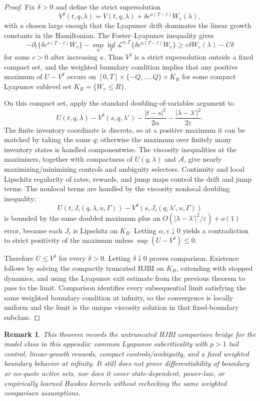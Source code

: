 \documentclass[11pt]{article}
\newtheorem{remark}[assumption]{Remark}
\begin{document}
\begin{proof}
Fix $\delta>0$ and define the strict supersolution
\[
V^\delta(t,q,\lambda)
=V(t,q,\lambda)+\delta e^{a(T-t)}W_v(\lambda),
\]
with $a$ chosen large enough that the Lyapunov drift dominates the linear
growth constants in the Hamiltonian. The Foster--Lyapunov inequality gives
\[
-\partial_t\{\delta e^{a(T-t)}W_v\}
-\sup_u\inf_\Gamma \mathcal L^{u,\Gamma}
\{\delta e^{a(T-t)}W_v\}
\ge c\delta W_v(\lambda)-C\delta
\]
for some $c>0$ after increasing $a$. Thus $V^\delta$ is a strict
supersolution outside a fixed compact set, and the weighted boundary condition
implies that any positive maximum of $U-V^\delta$ occurs on
$[0,T]\times\{-Q,\ldots,Q\}\times K_R$ for some compact Lyapunov sublevel set
$K_R=\{W_v\le R\}$.

On this compact set, apply the standard doubling-of-variables argument to
\[
U(t,q,\lambda)-V^\delta(s,q,\lambda')
-\frac{|t-s|^2}{2\alpha}
-\frac{|\lambda-\lambda'|^2}{2\varepsilon}.
\]
The finite inventory coordinate is discrete, so at a positive maximum it can
be matched by taking the same $q$; otherwise the maximum over finitely many
inventory states is handled componentwise. The viscosity inequalities at the
maximizers, together with compactness of $U(q,\lambda)$ and $\mathcal A$, give
nearly maximizing/minimizing controls and ambiguity selectors. Continuity and
local Lipschitz regularity of rates, rewards, and jump maps control the drift
and jump terms. The nonlocal terms are handled by the viscosity nonlocal
doubling inequality:
\[
U(t,J_i(q,\lambda,u,\Gamma))-V^\delta(s,J_i(q,\lambda',u,\Gamma))
\]
is bounded by the same doubled maximum plus an
$O(|\lambda-\lambda'|^2/\varepsilon)+o(1)$ error, because each $J_i$ is
Lipschitz on $K_R$. Letting $\alpha,\varepsilon\downarrow0$ yields a
contradiction to strict positivity of the maximum unless
$\sup(U-V^\delta)\le0$.

Therefore $U\le V^\delta$ for every $\delta>0$. Letting
$\delta\downarrow0$ proves comparison. Existence follows by solving the
compactly truncated HJBI on $K_R$, extending with stopped dynamics, and using
the Lyapunov exit estimate from the previous theorem to pass to the limit.
Comparison identifies every subsequential limit satisfying the same weighted
boundary condition at infinity, so the convergence is locally uniform and the
limit is the unique viscosity solution in that fixed-boundary subclass.
\end{proof}

\begin{remark}
This theorem records the untruncated HJBI comparison bridge for the model class
in this appendix: common Lyapunov subcriticality with $p>1$ tail control,
linear-growth rewards, compact controls/ambiguity, and a fixed weighted
boundary behavior at infinity. It still does not prove differentiability of
boundary or no-quote active sets, nor does it cover state-dependent, power-law,
or empirically learned Hawkes kernels without rechecking the same weighted
comparison assumptions.
\end{remark}
\end{document}
